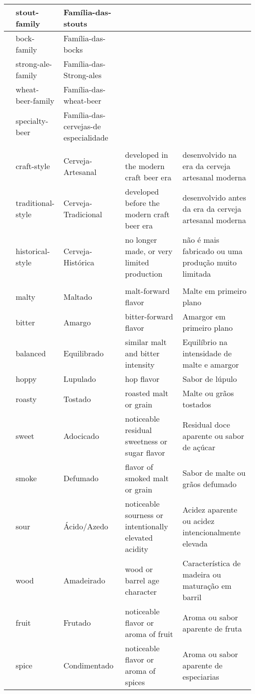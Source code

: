 \begin{longtable}{ | p{32mm} | p{32mm} | p{32mm} | p{32mm} | p{32mm} | }
\hline
& stout-family & Família-das-stouts & & \\
\hline
& bock-family & Família-das-bocks & & \\
\hline
& strong-ale-family & Família-das-Strong-ales & & \\
\hline
& wheat-beer-family & Família-das-wheat-beer & & \\
\hline
& specialty-beer & Família-das-cervejas-de especialidade & & \\
\hline
\rowcolor{darkgray}
\multicolumn{5}{|l|}{\color{white}\textbf{Era (Era)}} \\
\hline
& craft-style & Cerveja-Artesanal & developed in the modern craft beer era & desenvolvido na era da cerveja artesanal moderna \\
\hline
& traditional-style & Cerveja-Tradicional & developed before the modern craft beer era & desenvolvido antes da era da cerveja artesanal moderna \\
\hline
& historical-style & Cerveja-Histórica & no longer made, or very limited production & não é mais fabricado ou uma produção muito limitada \\
\hline
\rowcolor{darkgray}
\multicolumn{5}{|l|}{\color{white}\textbf{Dominant Flavor (Sabor Dominante)}} \\
\hline
& malty & Maltado & malt-forward flavor & Malte em primeiro plano \\
\hline
& bitter & Amargo & bitter-forward flavor & Amargor em primeiro plano \\
\hline
& balanced & Equilibrado & similar malt and bitter intensity & Equilíbrio na intensidade de malte e amargor \\
\hline
& hoppy & Lupulado & hop flavor & Sabor de lúpulo \\
\hline
& roasty & Tostado & roasted malt or grain & Malte ou grãos tostados \\
\hline
& sweet & Adocicado & noticeable residual sweetness or sugar flavor & Residual doce aparente ou sabor de açúcar \\
\hline
& smoke & Defumado & flavor of smoked malt or grain & Sabor de malte ou grãos defumado \\
\hline
& sour & Ácido/Azedo & noticeable sourness or intentionally elevated acidity & Acidez aparente ou acidez intencionalmente elevada \\
\hline
& wood & Amadeirado & wood or barrel age character & Característica de madeira ou maturação em barril \\
\hline
& fruit & Frutado & noticeable flavor or aroma of fruit & Aroma ou sabor aparente de fruta \\
\hline
& spice & Condimentado & noticeable flavor or aroma of spices & Aroma ou sabor aparente de especiarias \\
\hline
\end{longtable}
